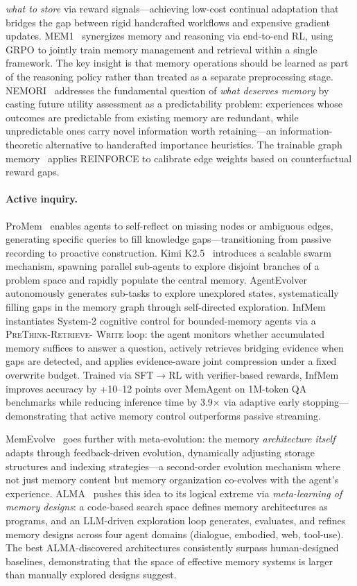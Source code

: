 \documentclass[hf]{ceurart}
\begin{document}
\emph{what to store} via reward signals---achieving low-cost continual
adaptation that bridges the gap between rigid handcrafted workflows
and expensive gradient updates.
MEM1~\cite{mem12025} synergizes memory and reasoning via end-to-end
RL, using GRPO to jointly train memory management and retrieval
within a single framework. The key insight is that memory operations
should be learned as part of the reasoning policy rather than
treated as a separate preprocessing stage.
NEMORI~\cite{nemori2025} addresses the fundamental question of
\emph{what deserves memory} by casting future utility assessment as
a predictability problem: experiences whose outcomes are predictable
from existing memory are redundant, while unpredictable ones carry
novel information worth retaining---an information-theoretic
alternative to handcrafted importance heuristics.
The trainable graph
memory~\cite{trainablegraph2025} applies REINFORCE to calibrate
edge weights based on counterfactual reward gaps.

\paragraph{Active inquiry.}
ProMem~\cite{promem2025} enables agents to self-reflect on missing
nodes or ambiguous edges, generating specific queries to fill
knowledge gaps---transitioning from passive recording to proactive
construction. Kimi K2.5~\cite{kimik25_2025} introduces a scalable
swarm mechanism, spawning parallel sub-agents to explore disjoint
branches of a problem space and rapidly populate the central memory.
AgentEvolver~\cite{agentevolver2025} autonomously generates sub-tasks
to explore unexplored states, systematically filling gaps in the
memory graph through self-directed exploration.
InfMem~\cite{infmem2026} instantiates System-2 cognitive control
for bounded-memory agents via a \textsc{PreThink}-\textsc{Retrieve}-%
\textsc{Write} loop: the agent monitors whether accumulated memory
suffices to answer a question, actively retrieves bridging evidence
when gaps are detected, and applies evidence-aware joint compression
under a fixed overwrite budget. Trained via SFT$\to$RL with
verifier-based rewards, InfMem improves accuracy by +10--12 points
over MemAgent on 1M-token QA benchmarks while reducing inference
time by 3.9$\times$ via adaptive early stopping---demonstrating
that active memory control outperforms passive streaming.

MemEvolve~\cite{memevolve2025} goes further with meta-evolution:
the memory \emph{architecture itself} adapts through feedback-driven
evolution, dynamically adjusting storage structures and indexing
strategies---a second-order evolution mechanism where not just memory
content but memory organization co-evolves with the agent's experience.
ALMA~\cite{alma2026} pushes this idea to its logical extreme via
\emph{meta-learning of memory designs}: a code-based search space
defines memory architectures as programs, and an LLM-driven
exploration loop generates, evaluates, and refines memory designs
across four agent domains (dialogue, embodied, web, tool-use).
The best ALMA-discovered architectures consistently surpass
human-designed baselines, demonstrating that the space of effective
memory systems is larger than manually explored designs suggest.
\end{document}
